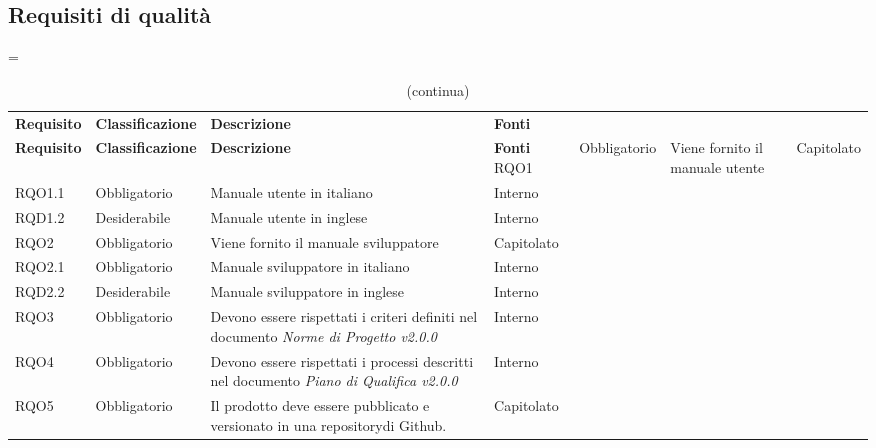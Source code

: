 \subsection{Requisiti di qualità}

\LTcapwidth=\linewidth
\begin{longtable}{ >{\centering}p{} >{\centering}p{}
		>{\raggedright}p{} >{\centering}p{}}
	\caption{Tabella dei requisiti di qualità}\\
	\rowcolorhead 
	\textbf{\color{white}Requisito} 
	& \textbf{\color{white}Classificazione} 
	& \centering\textbf{\color{white}Descrizione}
	& \textbf{\color{white}Fonti} 
	\endfirsthead
	\caption[]{(continua)}\\
	\rowcolorhead 
	\textbf{\color{white}Requisito} 
	& \textbf{\color{white}Classificazione} 
	& \centering\textbf{\color{white}Descrizione}
	& \textbf{\color{white}Fonti} 
	\endhead
	RQO1	&	Obbligatorio	&	Viene fornito il manuale utente	&	Capitolato	\tabularnewline
	RQO1.1	&	Obbligatorio	&	Manuale utente in italiano	&	Interno	\tabularnewline
	RQD1.2	&	Desiderabile	&	Manuale utente in inglese	&	Interno	\tabularnewline
	RQO2	&	Obbligatorio	&	Viene fornito il manuale sviluppatore	&	Capitolato	\tabularnewline
	RQO2.1	&	Obbligatorio	&		Manuale sviluppatore in italiano	&	Interno	\tabularnewline
	RQD2.2	&	Desiderabile	&		Manuale sviluppatore in inglese	&	Interno	\tabularnewline
	RQO3	&	Obbligatorio	&		Devono essere rispettati i criteri definiti nel documento \textit{Norme di Progetto v2.0.0}	&	Interno	\tabularnewline
	RQO4	& Obbligatorio	& 	Devono essere rispettati i processi descritti nel documento \textit{Piano di Qualifica v2.0.0} &	Interno \tabularnewline
	RQO5	&	Obbligatorio	&	Il prodotto deve essere pubblicato e versionato in una repository\glosp di Github\glo.	&	Capitolato
	\tabularnewline
	
\end{longtable}
	

